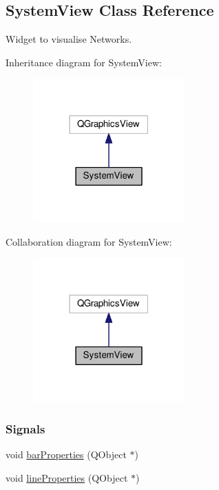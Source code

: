 \hypertarget{class_system_view}{}\subsection{System\+View Class Reference}
\label{class_system_view}


Widget to visualise Networks.  




Inheritance diagram for System\+View\+:
\nopagebreak
\begin{figure}[H]
\begin{center}
\leavevmode
\includegraphics[width=165pt]{class_system_view__inherit__graph}
\end{center}
\end{figure}


Collaboration diagram for System\+View\+:
\nopagebreak
\begin{figure}[H]
\begin{center}
\leavevmode
\includegraphics[width=165pt]{class_system_view__coll__graph}
\end{center}
\end{figure}
\subsubsection*{Signals}
\begin{DoxyCompactItemize}
\item 
void \hyperlink{class_system_view_a90bd4b070c8abaa5995899154421eb44}{bar\+Properties} (Q\+Object $\ast$)
\item 
void \hyperlink{class_system_view_a58c4a0bf68178ab59066819118214360}{line\+Properties} (Q\+Object $\ast$)
\end{DoxyCompactItemize}
